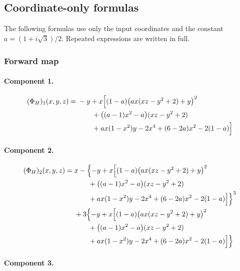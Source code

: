 \subsection{Coordinate-only formulas}

The following formulas use only the input coordinates and the constant
$a=(1+i\sqrt3)/2$. Repeated expressions are written in full.

\subsubsection*{Forward map}

\paragraph{Component 1.}

\begingroup\small\allowdisplaybreaks[4]

\begin{align*}
(\Phi_H)_1(x,y,z)={}&-y+x\Bigl[(1-a)\bigl(ax(xz-y^2+2)+y\bigr)^2\\
&\qquad +\bigl((a-1)x^2-a\bigr)(xz-y^2+2)\\
&\qquad +ax(1-x^2)y-2x^4+(6-2a)x^2-2(1-a)\Bigr]
\end{align*}

\endgroup

\paragraph{Component 2.}

\begingroup\small\allowdisplaybreaks[4]

\begin{align*}
(\Phi_H)_2(x,y,z)={}&x-\Bigl\{-y+x\Bigl[(1-a)\bigl(ax(xz-y^2+2)+y\bigr)^2\\
&\qquad +\bigl((a-1)x^2-a\bigr)(xz-y^2+2)\\
&\qquad +ax(1-x^2)y-2x^4+(6-2a)x^2-2(1-a)\Bigr]\Bigr\}^{3}\\
&{}+3\Bigl\{-y+x\Bigl[(1-a)\bigl(ax(xz-y^2+2)+y\bigr)^2\\
&\qquad +\bigl((a-1)x^2-a\bigr)(xz-y^2+2)\\
&\qquad +ax(1-x^2)y-2x^4+(6-2a)x^2-2(1-a)\Bigr]\Bigr\}
\end{align*}

\endgroup

\clearpage

\paragraph{Component 3.}

